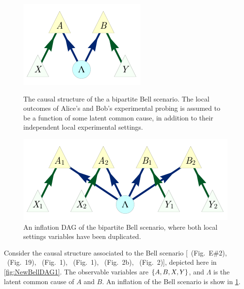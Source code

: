 \par\smallskip\nobreak

\begin{figure}[b]
\centering
\begin{minipage}[t]{0.45\linewidth}
\centering
\includegraphics[scale=1]{BellDagRaw.pdf}
\caption{The causal structure of the a bipartite Bell scenario. The local outcomes of Alice's and Bob's experimental probing is assumed to be a function of some latent common cause, in addition to their independent local experimental settings.}\label{fig:NewBellDAG1}
\end{minipage}
\hfill
\begin{minipage}[t]{0.45\linewidth}
\centering
\includegraphics[scale=1]{BellDagCopy.pdf}
\caption{An inflation DAG of the bipartite Bell scenario, where both local settings variables have been duplicated.}\label{fig:BellDagCopy1}
\end{minipage}
\end{figure}

Consider the causal structure associated to the Bell \cite{bell1964einstein,Brunner2013Bell,bell1966lhvm,CHSHOriginal} scenario [\citealp{pusey2014gdag}~(Fig.~E\#2), \citealp{WoodSpekkens}~(Fig.~19), \citealp{chaves2014novel}~(Fig.~1), \citealp{BeyondBellII}~(Fig.~1), \citealp{wolfe2015nonconvexity}~(Fig.~2b), \citealp{steeg2011relaxation}~(Fig.~2)], depicted here in \cref{fig:NewBellDAG1}. The observable variables are $\left\lbrace A,B,X,Y\right\rbrace$, and $\Lambda$ is the latent common cause of $A$ and $B$. An inflation of the Bell scenario is show in \cref{fig:BellDagCopy1}.

